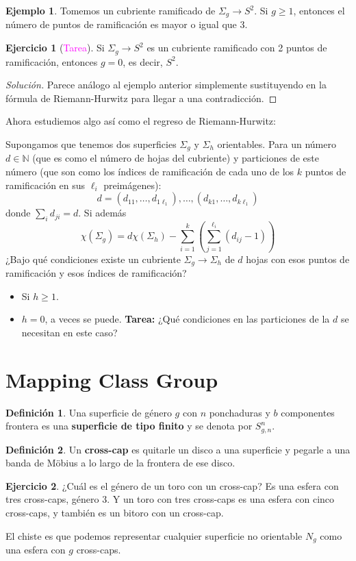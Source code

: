 \documentclass[spanish]{article}
\theoremstyle{definition}
\newtheorem*{defn}{Definición}
\newtheorem*{ejer}{Ejercicio}
\newtheorem*{ejem}{Ejemplo}
\newcommand{\N}{\mathbb{N}}
\begin{document}
\begin{ejem}
	Tomemos un cubriente ramificado de $\Sigma_g\to S^2$. Si $g\geq1$, entonces el número de puntos de ramificación es mayor o igual que 3.
\end{ejem}
\begin{ejer}[\textcolor{magenta}{Tarea}]
	Si $\Sigma_g\to S^2$ es un cubriente ramificado con 2 puntos de ramificación, entonces $g=0$, es decir, $S^2$.
\end{ejer}
\begin{proof}[Solución]
	Parece análogo al ejemplo anterior simplemente sustituyendo en la fórmula de Riemann-Hurwitz para llegar a una contradicción.
\end{proof}
Ahora estudiemos algo así como el regreso de Riemann-Hurwitz:

Supongamos que tenemos dos superficies $\Sigma_g$ y $\Sigma_h$ orientables. Para un número $d\in\N$ (que es como el número de hojas del cubriente) y particiones de este número (que son como los índices de ramificación de cada uno de los $k$ puntos de ramificación en sus $\ell_i$ preimágenes):
	\[d=(d_{11},\ldots,d_{1\ell_1}),\ldots,(d_{k1},\ldots,d_{k\ell_1})\]
donde $\sum_id_{ji}=d$.
Si además
	\[\chi(\Sigma_g)=d\chi(\Sigma_h)-\sum_{i=1}^k\left(\sum_{j=1}^{\ell_i}(d_{ij}-1)\right)\]
¿Bajo qué condiciones existe un cubriente $\Sigma_g\to\Sigma_h$ de $d$ hojas con esos puntos de ramificación y esos índices de ramificación?
\begin{itemize}
	\item Si $h\geq1$.
	\item $h=0$, a veces se puede. \textbf{Tarea:} ¿Qué condiciones en las particiones de la $d$ se necesitan en este caso?
\end{itemize}

\section{Mapping Class Group}
\begin{defn}
	Una superficie de género $g$ con $n$ ponchaduras y $b$ componentes frontera es una \textbf{superficie de tipo finito} y se denota por $S^n_{g,n}$.
\end{defn}
\begin{defn}
	Un \textbf{cross-cap} es quitarle un disco a una superficie y pegarle a una banda de Möbius a lo largo de la frontera de ese disco.
\end{defn}
\begin{ejer}
	¿Cuál es el género de un toro con un cross-cap? Es una esfera con tres cross-caps, género 3. Y un toro con tres cross-caps es una esfera con cinco cross-caps, y también es un bitoro con un cross-cap.
\end{ejer}
El chiste es que podemos representar cualquier superficie no orientable $N_g$ como una esfera con $g$ cross-caps.
\end{document}
